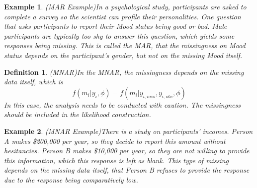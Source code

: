 \documentclass[preprint,12pt]{elsarticle}
\newtheorem{defn}{Definition}
\newtheorem{eg}{Example}
\begin{document}
\begin{eg}(MAR Example)\label{eg:MARExample}
    In a psychological study, participants are asked to complete a survey so the scientist can profile their personalities. 
    One question that asks participants to report their Mood status being good or bad. 
    Male participants are typically too shy to answer this question, which yields some responses being missing. 
    This is called the MAR, that the missingness on Mood status depends on the participant's gender, but not on the missing Mood itself.
\end{eg}
\begin{defn}(MNAR)\label{defn:MNAR}
    In the MNAR, the missingness depends on the missing data itself, which is 
    \begin{equation} 
        f(m_i|y_i,\phi)=f(m_i|y_{i,mis}, y_{i,obs}, \phi)
    \end{equation}
    In this case, the analysis needs to be conducted with caution. 
    The missingness should be included in the likelihood construction.
\end{defn}
\begin{eg}(MNAR Example)\label{eg:MNARExample}
    There is a study on participants' incomes. 
    Person A makes \$200,000 per year, so they decide to report this amount without hesitancies. 
    Person B makes \$10,000 per year, so they are not willing to provide this information, which this response is left as blank. 
    This type of missing depends on the missing data itself, that Person B refuses to provide the response due to the response being comparatively low. 
\end{eg}
 
\end{document}
